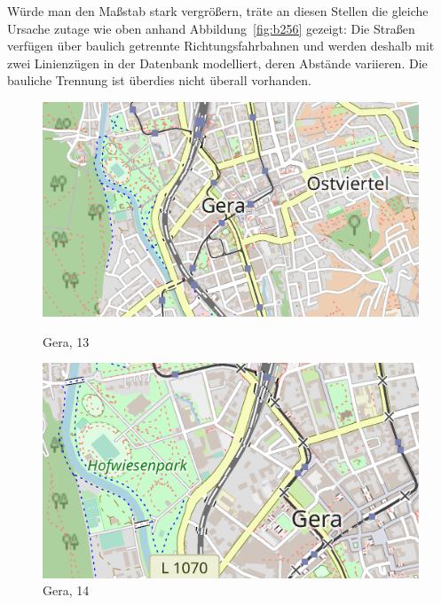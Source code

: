 \documentclass[../main/thesis.tex]{subfiles}
\begin{document}
Würde man den Maßstab stark vergrößern, träte an diesen Stellen die gleiche Ursache zutage wie oben anhand Abbildung~\ref{fig:b256}
gezeigt: Die Straßen verfügen über baulich getrennte Richtungsfahrbahnen und werden deshalb mit zwei Linienzügen in der Datenbank modelliert, deren Abstände variieren. Die bauliche Trennung ist überdies nicht überall vorhanden.

\begin{figure}[ht]
  \begin{minipage}{.5\linewidth}
    \centering
    \includegraphics[width=\ScaleIfNeeded]{../chapter2/gera-z13}
    \caption{Gera,  13}\label{fig:gera13}
  \end{minipage}%
  \begin{minipage}{.5\linewidth}
    \centering
    \includegraphics[width=\ScaleIfNeeded]{../chapter2/gera-z14}
    \caption{Gera,  14}\label{fig:gera14}
  \end{minipage}
\end{figure}
\end{document}

